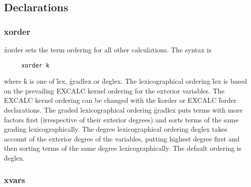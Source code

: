 


\subsection{Declarations}


\subsubsection*{xorder}

\f{xorder} sets the term ordering for all other calculations. The syntax is
\begin{verbatim}
     xorder k
\end{verbatim}
where \f{k} is one of \f{lex}, \f{gradlex} or \f{deglex}. The
lexicographical ordering \f{lex} is based on the prevailing EXCALC kernel
ordering for the exterior variables. The EXCALC kernel ordering can be
changed with the \REDUCE{} \f{korder} or EXCALC \f{forder} declarations. The
graded lexicographical ordering \f{gradlex} puts terms with more factors
first (irrespective of their exterior degrees) and sorts terms of the same
grading lexicographically. The degree lexicographical ordering \f{deglex}
takes account of the exterior degree of the variables, putting highest
degree first and then sorting terms of the same degree lexicographically.
The default ordering is \f{deglex}.


\subsubsection*{xvars}

